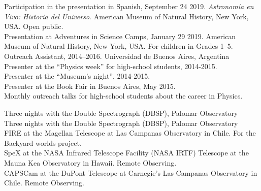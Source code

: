 \documentclass[10pt]{cv}
\newcommand\tab[1][1cm]{\hspace*{#1}}
\begin{document}
\begin{llist}
Participation in the presentation in Spanish, September 24 2019. \textit{Astronom\'ia en Vivo: Historia del Universo}. American Museum of Natural History, New York, USA. Open public.\\
Presentation at Adventures in Science Camps, January 29 2019. American Museum of Natural History, New York, USA. For children in Grades 1--5.\\
Outreach Assistant, 2014--2016. Universidad de Buenos Aires, Argentina\\
\tab Presenter at the ``Physics week'' for high-school students, 2014-2015.\\
\tab Presenter at the ``­Museum's night'', 2014-2015.\\
\tab Presenter at the Book Fair in Buenos Aires, May 2015.\\
\tab Monthly outreach talks for high-school students about the career in Physics.


Three nights with the Double Spectrograph (DBSP), 
Palomar Observatory \\
Three nights with the Double Spectrograph (DBSP), 
Palomar Observatory \\
FIRE at the Magellan Telescope at Las Campanas Observatory
 in Chile. For the Backyard worlds project. \\
SpeX at the NASA Infrared Telescope Facility (NASA IRTF) 	
Telescope at the Mauna Kea Observatory in Hawaii. Remote Observing. \\
CAPSCam at the DuPont Telescope	
at Carnegie's Las Campanas Observatory in Chile. Remote Observing.





\end{llist}
\end{document}
